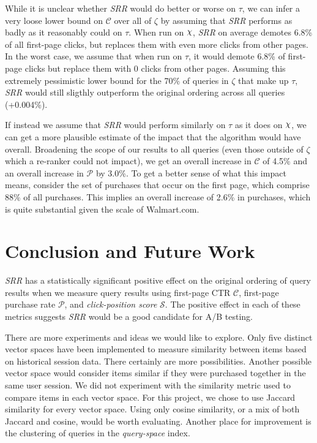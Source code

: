 \documentclass{article}
\def\Chi{\raisebox{2pt}{$\chi$}}
\begin{document}
While it is unclear whether {\em SRR} would do better or worse on $\tau$, we
can infer a very loose lower bound on $\mathscr{C}$ over all of $\zeta$ by
assuming that {\em SRR} performs as badly as it reasonably could on $\tau$.
When run on $\Chi$, {\em SRR} on average demotes 6.8\% of all first-page clicks,
but replaces them with even more clicks from other pages. In the worst case, we
assume that when run on $\tau$, it would demote 6.8\% of first-page clicks but
replace them with 0 clicks from other pages. Assuming this extremely
pessimistic lower bound for the 70\% of queries in $\zeta$ that make up $\tau$,
{\em SRR} would still sligthly outperform the original ordering across all
queries (+0.004\%).

If instead we assume that {\em SRR} would perform similarly on $\tau$ as it
does on $\Chi$, we can get a more plausible estimate of the impact that the
algorithm would have overall. Broadening the scope of our results to all
queries (even those outside of $\zeta$ which a re-ranker could not impact), we
get an overall increase in $\mathscr{C}$ of 4.5\% and an overall increase in
$\mathscr{P}$ by 3.0\%. To get a better sense of what this impact means,
consider the set of purchases that occur on the first page, which comprise 88\%
of all purchases. This implies an overall increase of 2.6\% in purchases, which
is quite substantial given the scale of Walmart.com.

\section{Conclusion and Future Work}

{\em SRR} has a statistically significant positive effect on the original
ordering of query results when we measure query results using first-page CTR
$\mathscr{C}$, first-page purchase rate $\mathscr{P}$, and {\em click-position
score} $\mathscr{S}$. The positive effect in each of these metrics suggests {\em
SRR} would be a good candidate for A/B testing.

There are more experiments and ideas we would like to explore. Only five
distinct vector spaces have been implemented to measure similarity between items
based on historical session data. There certainly are more possibilities.
Another possible vector space would consider items similar if they were
purchased together in the same user session. We did not experiment with the
similarity metric used to compare items in each vector space. For this project,
we chose to use Jaccard similarity for every vector space. Using only cosine
similarity, or a mix of both Jaccard and cosine, would be worth evaluating.
Another place for improvement is the clustering of queries in the {\em
query-space} index.
\end{document}
